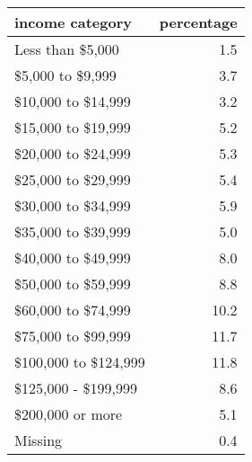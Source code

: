 \begin{table}[ht]
\centering
\begin{tabular}{lr}
  \hline
income category & percentage \\ 
  \hline
Less than \$5,000 & 1.5 \\ 
  \$5,000 to \$9,999 & 3.7 \\ 
  \$10,000 to \$14,999 & 3.2 \\ 
  \$15,000 to \$19,999 & 5.2 \\ 
  \$20,000 to \$24,999 & 5.3 \\ 
  \$25,000 to \$29,999 & 5.4 \\ 
  \$30,000 to \$34,999 & 5.9 \\ 
  \$35,000 to \$39,999 & 5.0 \\ 
  \$40,000 to \$49,999 & 8.0 \\ 
  \$50,000 to \$59,999 & 8.8 \\ 
  \$60,000 to \$74,999 & 10.2 \\ 
  \$75,000 to \$99,999 & 11.7 \\ 
  \$100,000 to \$124,999 & 11.8 \\ 
  \$125,000 - \$199,999 & 8.6 \\ 
  \$200,000 or more & 5.1 \\ 
  Missing & 0.4 \\ 
   \hline
\end{tabular}
\end{table}
